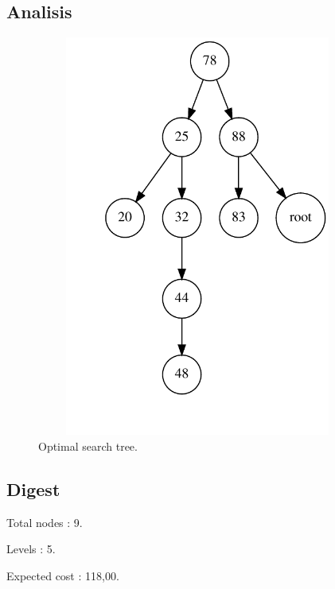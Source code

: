 \documentclass{article}
\begin{document}
\subsection{Analisis}
\begin{figure}[H]\centering
\noindent\includegraphics[height=500px, width=400px, keepaspectratio]{reports/tree.pdf}
\caption{Optimal search tree.}
\end{figure}
\newpage

\subsection{Digest}
\begin{compactitem}
\item Total nodes : {\Large 9}.
\item Levels : {\Large 5}.
\item Expected cost : {\Large 118,00}.
\end{compactitem}
\end{document}
